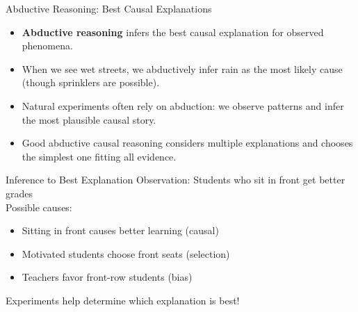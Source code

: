 \documentclass{beamer}
\begin{document}
	\begin{frame}{Abductive Reasoning: Best Causal Explanations}
		\begin{itemize}
			\item \textbf{Abductive reasoning} infers the best causal explanation for observed phenomena.
			\item When we see wet streets, we abductively infer rain as the most likely cause (though sprinklers are possible).
			\item Natural experiments often rely on abduction: we observe patterns and infer the most plausible causal story.
			\item Good abductive causal reasoning considers multiple explanations and chooses the simplest one fitting all evidence.
		\end{itemize}
		
		\begin{alertblock}{Inference to Best Explanation}
			Observation: Students who sit in front get better grades\\
			Possible causes:
			\begin{itemize}
				\item Sitting in front causes better learning (causal)
				\item Motivated students choose front seats (selection)
				\item Teachers favor front-row students (bias)
			\end{itemize}
			Experiments help determine which explanation is best!
		\end{alertblock}
	\end{frame}
	
\end{document}
